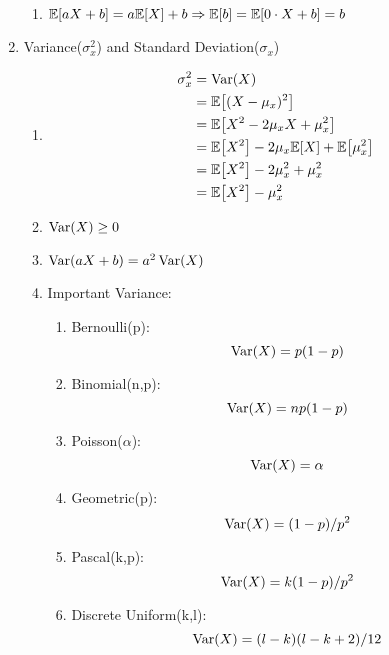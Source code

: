 \begin{enumerate}
{\begin{enumerate}
            \item $\E{aX+b}=a\E{X}+b \Rightarrow \E{b}=\E{0\cdot X+b}=b$
        \end{enumerate}
    }
    \item Variance($\sigma_x^2$) and Standard Deviation($\sigma_x$){
        \begin{enumerate}
            \item {
                \begin{align*}
                    \sigma_x^2 
                    &= \Var(X) \\
                    &= \E{(X-\mu_x)^2} \\
                    &= \E{X^2-2\mu_xX+\mu_x^2} \\
                    &= \E{X^2}-2\mu_x\E{X}+\E{\mu_x^2} \\
                    &= \E{X^2}-2\mu_x^2+\mu_x^2 \\
                    &= \E{X^2}-\mu_x^2
                \end{align*}
            }
            \item $\mathop{\mathrm{Var}}\nolimits(X)\geq 0$
            \item $\mathop{\mathrm{Var}}\nolimits(aX+b)=a^2\mathop{\mathrm{Var}}\nolimits(X)$
            \item Important Variance:{
                \begin{enumerate}
                    \item Bernoulli(p): \[\mathop{\mathrm{Var}}\nolimits(X)=p(1-p)\]
                    \item Binomial(n,p): \[\mathop{\mathrm{Var}}\nolimits(X)=np(1-p)\]
                    \item Poisson($\alpha$): \[\mathop{\mathrm{Var}}\nolimits(X)=\alpha\]
                    \item Geometric(p): \[\mathop{\mathrm{Var}}\nolimits(X)=(1-p)/p^2\]
                    \item Pascal(k,p): \[\mathop{\mathrm{Var}}\nolimits(X)=k(1-p)/p^2\]
                    \item Discrete Uniform(k,l): \[\mathop{\mathrm{Var}}\nolimits(X)=(l-k)(l-k+2)/12\]
                \end{enumerate}
            }
        \end{enumerate}
    }
\end{enumerate}